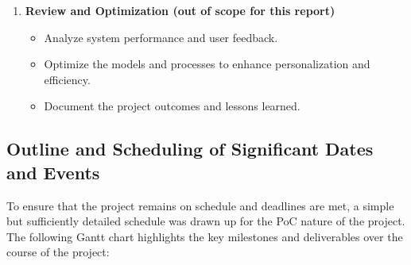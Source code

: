 \documentclass[%
pdftex,
oneside,			%
11pt,				%
parskip=half,		%
headheight = 12pt,	%
headsepline,		%
footsepline,		%
footheight = 16pt,	%
abstracton,		%
DIV=calc,		%
BCOR=8mm,		%
headinclude=false,	%
footinclude=false,	%
listof=totoc,		%
toc=bibliography,	%
]{scrreprt}	%
\begin{document}
\begin{enumerate}
\begin{itemize}
                \item Continuously refine and improve the models based on feedback and performance data.
            \end{itemize}
            \item \textbf{Review and Optimization (out of scope for this report)}
            \begin{itemize}
                \item Analyze system performance and user feedback.
                \item Optimize the models and processes to enhance personalization and efficiency.
                \item Document the project outcomes and lessons learned.
            \end{itemize}
        \end{enumerate}

        \subsection{Outline and Scheduling of Significant Dates and Events}

            To ensure that the project remains on schedule and deadlines are met, a simple but sufficiently detailed schedule was drawn up for the PoC nature of the project. 
            The following Gantt chart highlights the key milestones and deliverables over the course of the project:
\end{document}
